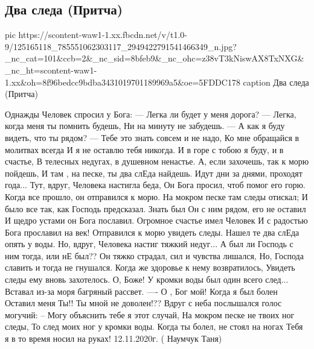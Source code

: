  
 
 

\subsection{Два следа (Притча)}
\label{sec:13_11_2020.fb.tanya_naumchuk.1.dva_sleda}

\ifcmt
pic https://scontent-waw1-1.xx.fbcdn.net/v/t1.0-9/125165118_785551062303117_2949422791541466349_n.jpg?_nc_cat=101&ccb=2&_nc_sid=8bfeb9&_nc_ohc=z38vT3kNiswAX8TxNXG&_nc_ht=scontent-waw1-1.xx&oh=8f96bedcc9bdba3431019701189969a5&oe=5FDDC178
caption Два следа (Притча)
\fi

\begin{multicols}{2}
\obeycr
Однажды Человек спросил у Бога:
--- Легка ли будет у меня дорога?
--- Легка, когда меня ты помнить будешь,
Ни на минуту не забудешь.
--- А как я буду видеть, что ты рядом?
--- Тебе  это знать совсем и не надо,
Ко мне обращайся в молитвах всегда
И я не оставлю тебя никогда.
И в горе с тобою я буду, и в счастье,
В телесных недугах, в душевном ненастье.
А, если захочешь, так к морю пойдешь,
И там , на песке, ты два слЕда найдешь.
Идут дни за днями, проходят года...
Тут, вдруг, Человека настигла беда,
Он Бога просил, чтоб помог его горю.
Когда все прошло, он отправился к морю.
На мокром песке там следы отискал;
И было все так, как Господь предсказал.
Знать был Он с ним рядом, его не оставил
И щедро устами он Бога пославил.
Огромное счастье имел Человек
И с радостью Бога прославил на век!
Отправился к морю увидеть следы.
Нашел те два слЕда опять у воды.
Но, вдруг, Человека настиг тяжкий недуг...
А был ли Господь с ним тогда, или нЕ был??
Он тяжко страдал, сил и чувства лишался,
Но, Господа славить и тогда не гнушался.
Когда же здоровье к нему возвратилось,
Увидеть следы ему вновь захотелось.
О, Боже! У кромки воды был один всего след...
Вставал из-за моря багряный рассвет.
---- О , Бог мой! Когда я был болен
Оставил меня Ты!! Ты мной не доволен!??
Вдруг с неба послышался голос могучий:
-- Могу объяснить тебе я этот случай,
На мокром песке не твоих ног следы,
То след моих ног у кромки воды.
Когда ты болел, не стоял на ногах
Тебя я в то время носил на руках!
12.11.2020г.  ( Наумчук Таня)
\restorecr
\end{multicols}

